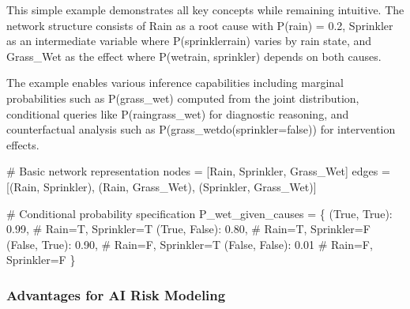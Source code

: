 \documentclass[
  11pt,
  letterpaper,
]{book}
\newenvironment{Shaded}{\begin{snugshade}}{\end{snugshade}}
\newcommand{\CommentTok}[1]{\textcolor[rgb]{0.37,0.37,0.37}{#1}}
\newcommand{\FloatTok}[1]{\textcolor[rgb]{0.68,0.00,0.00}{#1}}
\newcommand{\NormalTok}[1]{\textcolor[rgb]{0.00,0.23,0.31}{#1}}
\newcommand{\OperatorTok}[1]{\textcolor[rgb]{0.37,0.37,0.37}{#1}}
\newcommand{\StringTok}[1]{\textcolor[rgb]{0.13,0.47,0.30}{#1}}
\newcommand{\VariableTok}[1]{\textcolor[rgb]{0.07,0.07,0.07}{#1}}
\begin{document}
This simple example demonstrates all key concepts while remaining
intuitive. The network structure consists of Rain as a root cause with
P(rain) = 0.2, Sprinkler as an intermediate variable where
P(sprinkler\textbar rain) varies by rain state, and Grass\_Wet as the
effect where P(wet\textbar rain, sprinkler) depends on both causes.

The example enables various inference capabilities including marginal
probabilities such as P(grass\_wet) computed from the joint
distribution, conditional queries like P(rain\textbar grass\_wet) for
diagnostic reasoning, and counterfactual analysis such as
P(grass\_wet\textbar do(sprinkler=false)) for intervention effects.

\begin{Shaded}
\begin{Highlighting}[]
\CommentTok{\# Basic network representation}
\NormalTok{nodes }\OperatorTok{=}\NormalTok{ [}\StringTok{\textquotesingle{}Rain\textquotesingle{}}\NormalTok{, }\StringTok{\textquotesingle{}Sprinkler\textquotesingle{}}\NormalTok{, }\StringTok{\textquotesingle{}Grass\_Wet\textquotesingle{}}\NormalTok{]}
\NormalTok{edges }\OperatorTok{=}\NormalTok{ [(}\StringTok{\textquotesingle{}Rain\textquotesingle{}}\NormalTok{, }\StringTok{\textquotesingle{}Sprinkler\textquotesingle{}}\NormalTok{), (}\StringTok{\textquotesingle{}Rain\textquotesingle{}}\NormalTok{, }\StringTok{\textquotesingle{}Grass\_Wet\textquotesingle{}}\NormalTok{), (}\StringTok{\textquotesingle{}Sprinkler\textquotesingle{}}\NormalTok{, }\StringTok{\textquotesingle{}Grass\_Wet\textquotesingle{}}\NormalTok{)]}

\CommentTok{\# Conditional probability specification}
\NormalTok{P\_wet\_given\_causes }\OperatorTok{=}\NormalTok{ \{}
\NormalTok{    (}\VariableTok{True}\NormalTok{, }\VariableTok{True}\NormalTok{): }\FloatTok{0.99}\NormalTok{,    }\CommentTok{\# Rain=T, Sprinkler=T}
\NormalTok{    (}\VariableTok{True}\NormalTok{, }\VariableTok{False}\NormalTok{): }\FloatTok{0.80}\NormalTok{,   }\CommentTok{\# Rain=T, Sprinkler=F  }
\NormalTok{    (}\VariableTok{False}\NormalTok{, }\VariableTok{True}\NormalTok{): }\FloatTok{0.90}\NormalTok{,   }\CommentTok{\# Rain=F, Sprinkler=T}
\NormalTok{    (}\VariableTok{False}\NormalTok{, }\VariableTok{False}\NormalTok{): }\FloatTok{0.01}   \CommentTok{\# Rain=F, Sprinkler=F}
\NormalTok{\}}
\end{Highlighting}
\end{Shaded}

\subsubsection{Advantages for AI Risk
Modeling}\label{sec-modeling-advantages}
\end{document}
